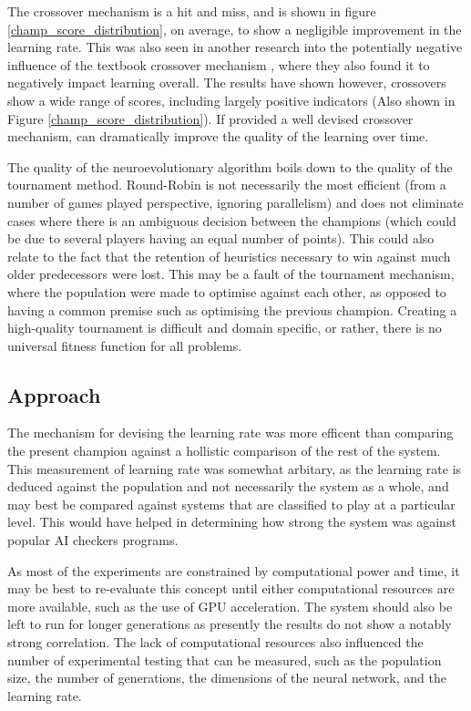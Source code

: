 \documentclass[12pt,a4paper]{article}
\begin{document}
    The crossover mechanism is a hit and miss, and is shown in figure \ref{champ_score_distribution}, on average, to show a negligible improvement in the learning rate. This was also seen in another research into the potentially negative influence of the textbook crossover mechanism \cite{emmanouilidis_comparison_2000}, where they also found it to negatively impact learning overall. The results have shown however, crossovers show a wide range of scores, including largely positive indicators (Also shown in Figure \ref{champ_score_distribution}). If provided a well devised crossover mechanism, can dramatically improve the quality of the learning over time.

    The quality of the neuroevolutionary algorithm boils down to the quality of the tournament method. Round-Robin is not necessarily the most efficient (from a number of games played perspective, ignoring  parallelism) and does not eliminate cases where there is an ambiguous decision between the champions (which could be due to several players having an equal number of points). This could also relate to the fact that the retention of heuristics necessary to win against much older predecessors were lost. This may be a fault of the tournament mechanism, where the population were made to optimise against each other, as opposed to having a common premise such as optimising the previous champion. Creating a high-quality tournament is difficult and domain specific, or rather, there is no universal fitness function for all problems.

    \subsection{Approach}
        The mechanism for devising the learning rate was more efficent than comparing the present champion against a hollistic comparison of the rest of the system. This measurement of learning rate was somewhat arbitary, as the learning rate is deduced against the population and not necessarily the system as a whole, and may best be compared against systems that are classified to play at a particular level. This would have helped in determining how strong the system was against popular AI checkers programs.

        As most of the experiments are constrained by computational power and time, it may be best to re-evaluate this concept until either computational resources are more available, such as the use of GPU acceleration. The system should also be left to run for longer generations as presently the results do not show a notably strong correlation. The lack of computational resources also influenced the number of experimental testing that can be measured, such as the population size, the number of generations, the dimensions of the neural network, and the learning rate.
        
\end{document}
